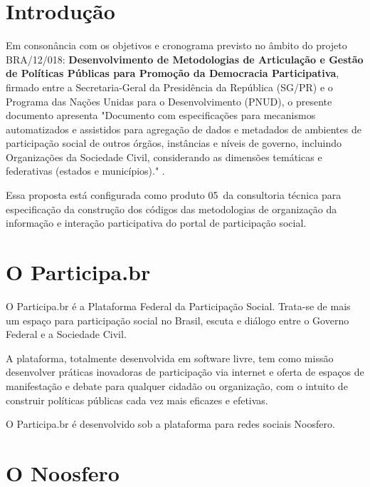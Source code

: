 \documentclass[12pt]{article}
\newcommand{\ProductNumber}{05}
\newcommand{\ProductDescription}{"Documento com especificações para mecanismos
  automatizados e assistidos para agregação de dados e metadados de ambientes
  de participação social de outros órgãos, instâncias e níveis de governo,
  incluindo Organizações da Sociedade Civil, considerando as dimensões
  temáticas e federativas (estados e municípios)."
}
\newcommand{\PalavrasChave}{agregação, api, cidade democrática, interoperabilidade}
\begin{document}




\tableofcontents
\newpage

\begin{abstract}
Documento com proposta de interoperabilidade entre o Participa.br e o Cidade
Democrática, proposta de API e funcionalidades para moderação de conteúdos
possibilitando agregação assistida pelos administradores do ambiente. \\


{\bf Palavras-chave:} \PalavrasChave.
\end{abstract}
\newpage

\section{Introdução}

Em consonância com os objetivos e cronograma previsto no âmbito do
projeto BRA/12/018:
\textbf{Desenvolvimento de Metodologias de Articulação e Gestão de
Políticas Públicas para Promoção da Democracia Participativa},
firmado entre a Secretaria-Geral da Presidência da República
(SG/PR) e o Programa das Nações Unidas para o Desenvolvimento (PNUD),
o presente documento apresenta \ProductDescription.

Essa proposta está configurada como produto \ProductNumber~da consultoria técnica
para especificação da construção dos códigos das metodologias de
organização da informação e interação participativa do portal de
participação social.

\section{O Participa.br}

O Participa.br é a Plataforma Federal da Participação Social. Trata-se de mais
um espaço para participação social no Brasil, escuta e diálogo entre o Governo
Federal e a Sociedade Civil. 

A plataforma, totalmente desenvolvida em software livre, tem como missão
desenvolver práticas inovadoras de participação via internet e oferta de
espaços de manifestação e debate para qualquer cidadão ou organização, com o
intuito de construir políticas públicas cada vez mais eficazes e efetivas.

O Participa.br é desenvolvido sob a plataforma para redes sociais Noosfero.

\section{O Noosfero}
\end{document}
